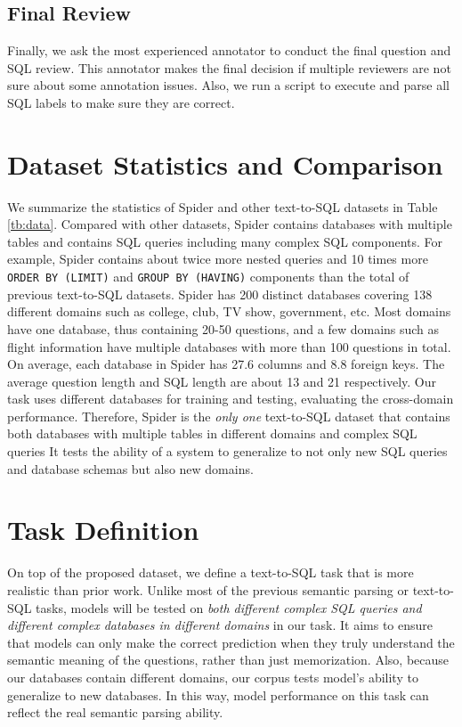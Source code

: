 \documentclass[11pt,a4paper]{article}
\begin{document}
\subsection{Final Review}
\label{sec:final_question}

Finally, we ask the most experienced annotator to conduct the final question and SQL review. This annotator makes the final decision if multiple reviewers are not sure about some annotation issues. Also, we run a script to execute and parse all SQL labels to make sure they are correct.




\section{Dataset Statistics and Comparison}
\label{sec:data_analysis}
We summarize the statistics of Spider and other text-to-SQL datasets in Table \ref{tb:data}.
Compared with other datasets, Spider contains databases with multiple tables and contains SQL queries including many complex SQL components. 
For example, Spider contains about twice more nested queries and 10 times more \texttt{ORDER BY (LIMIT)} and \texttt{GROUP BY (HAVING)} components
than the total of previous text-to-SQL datasets.
Spider has 200 distinct databases covering 138 different domains such as college, club, TV show, government, etc.
Most domains have one database, thus containing 20-50 questions, and a few domains such as flight information have multiple databases with more than 100 questions in total.
On average, each database in Spider has 27.6 columns and 8.8 foreign keys.
The average question length and SQL length are about 13 and 21 respectively.
Our task uses different databases for training and testing, evaluating the cross-domain performance.
Therefore, Spider is the \textit{only one} text-to-SQL dataset that contains both databases with multiple tables in different domains and complex SQL queries
It tests the ability of a system to generalize to not only new SQL queries and database schemas but also new domains.







\section{Task Definition}
\label{sec:task}
On top of the proposed dataset, we define a text-to-SQL task that is more realistic than prior work. Unlike most of the previous semantic parsing or text-to-SQL tasks, models will be tested on \textit{both different complex SQL queries and different complex databases in different domains} in our task. It aims to ensure that models can only make the correct prediction when they truly understand the semantic meaning of the questions, rather than just memorization. Also, because our databases contain different domains, our corpus tests model's ability to generalize to new databases. In this way, model performance on this task can reflect the real semantic parsing ability.
\end{document}
